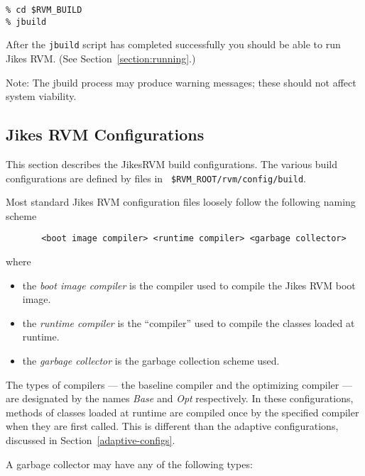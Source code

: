 \begin{enumerate}
\begin{verbatim}
% cd $RVM_BUILD
% jbuild
\end{verbatim}


After the {\tt jbuild} script has completed successfully you should be able 
to run Jikes RVM.  (See Section~\ref{section:running}.)

Note: The jbuild process may produce warning messages; these should not
affect system viability.

\end{enumerate}

\AIXPPCJikesTMFooter

\subsection{Jikes RVM Configurations}\label{configs}

This section describes the Jikes\trademark RVM build configurations.
The various 
build configurations are defined by files in {\tt
\$RVM\_ROOT/rvm/config/build}.

Most standard Jikes RVM configuration files loosely follow the
following naming scheme 
\begin{verbatim}
       <boot image compiler> <runtime compiler> <garbage collector>
\end{verbatim}

where
\begin{itemize}
\item the {\em boot image compiler} is the compiler used to compile
the Jikes RVM boot image. 
\item the {\em runtime compiler} is the ``compiler'' used to compile
the classes loaded at runtime.  
\item the {\em garbage collector} is the garbage collection scheme used.
\end{itemize}

The types of compilers --- the baseline compiler and 
the optimizing compiler --- are designated by the names {\em Base}
and {\em Opt} respectively.  In these configurations,
methods of classes loaded at runtime are compiled once by the specified
compiler when they are first called.
This is different than the adaptive configurations,
discussed in Section~\ref{adaptive-configs}.

A garbage collector may have any of the following types:

